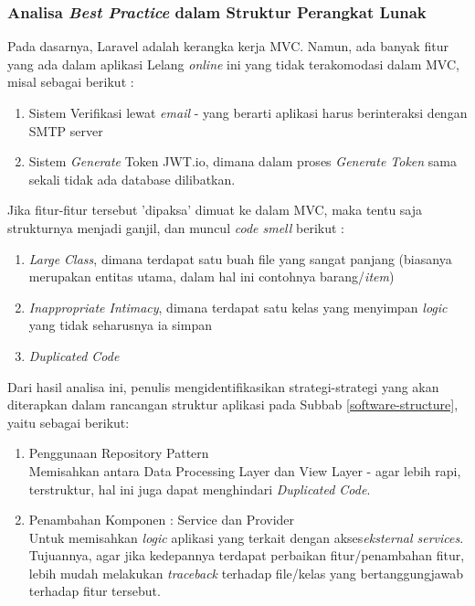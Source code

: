 	\subsubsection{Analisa \textit{Best Practice} dalam Struktur Perangkat Lunak}
		\label{alasan-best-practice}
		Pada dasarnya, Laravel adalah kerangka kerja MVC. Namun, ada banyak fitur yang ada dalam aplikasi Lelang \textit{online} ini yang tidak terakomodasi dalam MVC, misal sebagai berikut :
		\begin{enumerate}
			\item Sistem Verifikasi lewat \textit{email} - yang berarti aplikasi harus berinteraksi dengan SMTP server
			\item Sistem \textit{Generate} Token JWT.io, dimana dalam proses \textit{Generate Token} sama sekali tidak ada database dilibatkan.
		\end{enumerate}
		\indent Jika fitur-fitur tersebut 'dipaksa' dimuat ke dalam MVC, maka tentu saja strukturnya menjadi ganjil, dan muncul \textit{code smell} berikut :
		\begin{enumerate}
			\item \textit{Large Class}, dimana terdapat satu buah file yang sangat panjang (biasanya merupakan entitas utama, dalam hal ini contohnya barang/\textit{item})
			\item \textit{Inappropriate Intimacy}, dimana terdapat satu kelas yang menyimpan \textit{logic} yang tidak seharusnya ia simpan
			\item \textit{Duplicated Code}
		\end{enumerate}		
		\indent Dari hasil analisa ini, penulis mengidentifikasikan strategi-strategi yang akan diterapkan dalam rancangan struktur aplikasi pada Subbab \ref{software-structure}, yaitu sebagai berikut:
			\begin{enumerate}
				\item Penggunaan Repository Pattern
				\\ Memisahkan antara Data Processing Layer dan View Layer - agar lebih rapi, terstruktur, hal ini juga dapat menghindari \textit{Duplicated Code}.
				\item Penambahan Komponen : Service dan Provider \\
				Untuk memisahkan \textit{logic} aplikasi yang terkait dengan akses\textit{eksternal services}. Tujuannya, agar jika kedepannya terdapat perbaikan fitur/penambahan fitur, lebih mudah melakukan \textit{traceback} terhadap file/kelas yang bertanggungjawab terhadap fitur tersebut.
			\end{enumerate}
	
